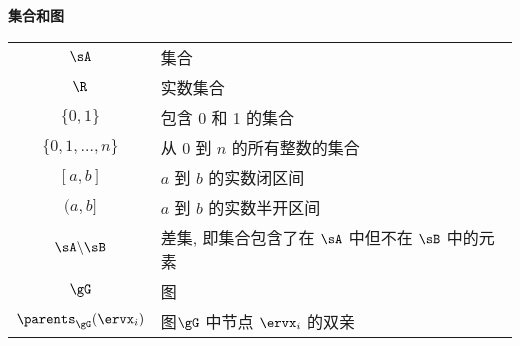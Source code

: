 \vspace{\notationgap}
\begin{minipage}{\textwidth}
\centerline{\bf 集合和图}
\bgroup
\def\arraystretch{1.5}
\begin{tabular}{cp{3.25in}}
$\displaystyle \sA$ & 集合\\
$\displaystyle \R$ & 实数集合 \\
$\displaystyle \{0, 1\}$ & 包含 0 和 1 的集合 \\
$\displaystyle \{0, 1, \dots, n \}$ & 从 $0$ 到 $n$ 的所有整数的集合 \\
$\displaystyle [a, b]$ &  $a$ 到 $b$ 的实数闭区间\\
$\displaystyle (a, b]$ & $a$ 到 $b$ 的实数半开区间\\
$\displaystyle \sA \backslash \sB$ & 差集, 即集合包含了在 $\sA$ 中但不在 $\sB$ 中的元素\\
$\displaystyle \gG$ & 图\\
$\displaystyle \parents_\gG(\ervx_i)$ & 图$\gG$ 中节点 $\ervx_i$ 的双亲
\end{tabular}
\egroup
{}
\end{minipage}

